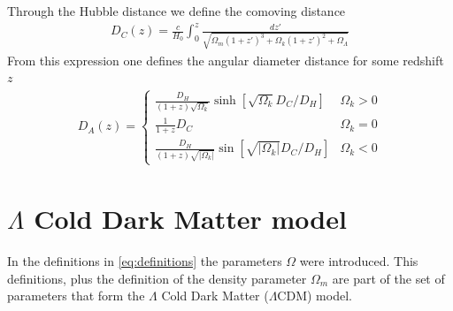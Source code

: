 Through the Hubble distance we define the comoving distance 
\begin{align}
	D_C(z) = \frac{c}{H_0}\int_{0}^{z} \frac{dz'}{\sqrt{\Omega_m(1+z')^3 + \Omega_k(1+z')^2 + \Omega_\Lambda} } 
\end{align}
From this expression one defines the angular diameter distance for some redshift $z$
\begin{align}
	D_A(z) = \begin{cases}
		\frac{D_H}{\left( 1+z \right) \sqrt{\Omega_k} }\sinh \left[ \sqrt{\Omega_k} D_C /D_H \right]  	 &\Omega_k >0\\
		\frac{1}{1+z}D_C& \Omega_k =  0\\
		\frac{D_H}{\left( 1+z \right) \sqrt{|\Omega_k|}} \sin \left[ \sqrt{|\Omega_k|} D_C /D_H \right]  	 &\Omega_k <0
		\label{eq:DA-definition}
	\end{cases}
\end{align}

\section{$\Lambda$ Cold Dark Matter model}
\label{sec:LCDM}

In the definitions in \eqref{eq:definitions} the parameters $\Omega$ were introduced. This definitions, plus the definition of the density parameter $\Omega_m$ are part of the set of parameters that form the $\Lambda$ Cold Dark Matter ($\Lambda$CDM) model. \\

